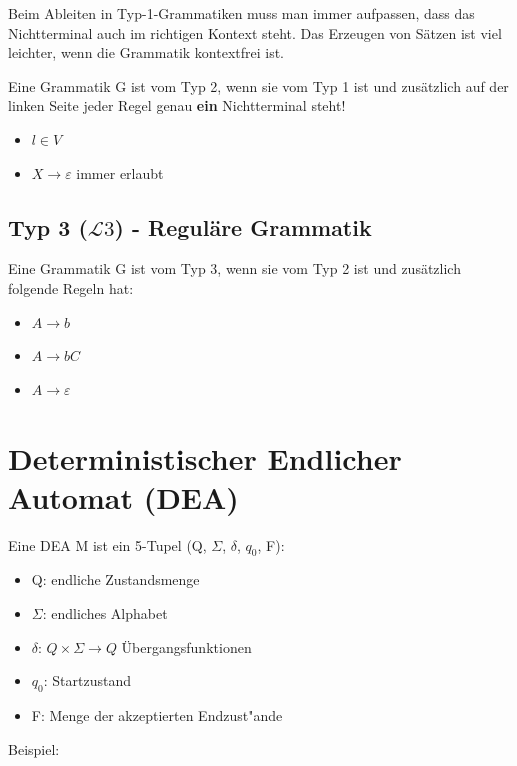 \documentclass[11pt, a4paper]{scrartcl}
\begin{document}
Beim Ableiten in Typ-1-Grammatiken muss man immer aufpassen, dass das Nichtterminal auch im richtigen Kontext steht. 
Das Erzeugen von Sätzen ist viel leichter, wenn die Grammatik kontextfrei ist. 

Eine Grammatik G ist vom Typ 2, wenn sie vom Typ 1 ist und zusätzlich auf der linken Seite jeder Regel genau \textbf{ein} Nichtterminal steht!

\begin{itemize}
    \item $l \in V$
    \item $X \rightarrow \varepsilon$ immer erlaubt
\end{itemize}

\vspace{0.5em}

\subsection{Typ 3 ($\mathcal{L}3$) - Reguläre Grammatik}

Eine Grammatik G ist vom Typ 3, wenn sie vom Typ 2 ist und zusätzlich folgende Regeln hat:

\begin{itemize}
    \item $A \rightarrow b$
    \item $A \rightarrow bC$
    \item $A \rightarrow \varepsilon$
\end{itemize}


\newpage

\section{Deterministischer Endlicher Automat (DEA)}

Eine DEA M ist ein 5-Tupel (Q, $\Sigma$, $\delta$, $q_0$, F):

\begin{itemize}
    \item Q: endliche Zustandsmenge
    \item $\Sigma$: endliches Alphabet
    \item $\delta$: $Q \times \Sigma \rightarrow Q$ Übergangsfunktionen
    \item $q_0$: Startzustand
    \item F: Menge der akzeptierten Endzust"ande
\end{itemize}

\vspace{2em}
Beispiel:
\vspace{1em}
\end{document}
